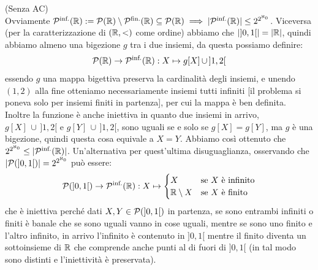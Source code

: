 \begin{soln}
	(Senza AC)\\
	Ovviamente $\mathcal{P}^{\text{inf.}}(\mathbb R) := \mathcal{P}(\mathbb R)\setminus\mathcal{P}^{\text{fin.}}(\mathbb R) \subseteq \mathcal{P}(\mathbb R) \implies |\mathcal{P}^{\text{inf.}}(\mathbb R)|\leq 2^{2^{\aleph_0}}$. Viceversa (per la caratterizzazione di $(\mathbb R,<)$ come ordine) abbiamo che $|]0,1[| = |\mathbb R|$,
	quindi abbiamo almeno una bigezione $g$ tra i due insiemi, da questa possiamo definire:
	\[ \mathcal{P}(\mathbb R) \to \mathcal{P}^{\text{inf.}}(\mathbb R) : X \mapsto g[X] \, \cup \, ]1,2[
		\]
	essendo $g$ una mappa bigettiva preserva la cardinalit\`a degli insiemi, e unendo $(1,2)$ alla fine otteniamo necessariamente insiemi tutti infiniti [il problema si poneva solo per insiemi finiti in partenza], per cui la mappa \`e ben definita.
	Inoltre la funzione \`e anche iniettiva in quanto due insiemi in arrivo, $g[X] \,\cup\, ]1,2[$ e $g[Y] \,\cup \,]1,2[$, sono uguali se e solo se $g[X] = g[Y]$, ma $g$ \`e una bigezione,
	quindi questa cosa equivale a $X = Y$. Abbiamo cos\`i ottenuto che $2^{2^{\aleph_0}} \leq |\mathcal{P}^{\text{inf.}}(\mathbb R)|$. Un'alternativa per quest'ultima disuguaglianza, osservando che $|\mathcal{P}(]0,1[)| = 2^{2^{\aleph_0}}$ pu\`o essere:
	\[ \mathcal{P}(]0,1[) \to \mathcal{P}^{\text{inf.}}(\mathbb R) : X \mapsto \begin{cases}
		X &\text{se $X$ \`e infinito} \\
		\mathbb R \setminus X &\text{se $X$ \`e finito}
	\end{cases}
		\]
	che \`e iniettiva perch\'e dati $X,Y \in \mathcal{P}(]0,1[)$ in partenza, se sono entrambi infiniti o finiti \`e banale che se sono uguali vanno in cose uguali, mentre se sono uno finito e l'altro infinito, in arrivo l'infinito \`e contenuto in $]0,1[$ mentre il finito diventa un sottoinsieme di $\mathbb R$ che comprende anche punti al di fuori di $]0,1[$ (in tal modo sono distinti e l'iniettivit\`a \`e preservata).
\end{soln}

